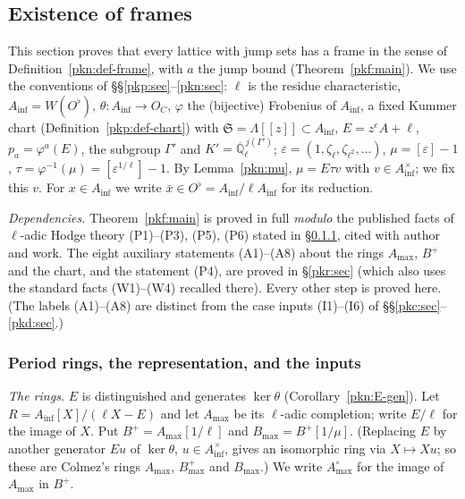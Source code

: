 \documentclass[10pt]{amsart}
\theoremstyle{definition}
\theoremstyle{remark}
\newcommand{\Q}{\mathbb Q}
\begin{document}
\providecommand{\auO}{\mathcal O}
\providecommand{\auQlb}{\overline{\Q}_\ell}
\providecommand{\pkpA}{A_{\mathrm{inf}}}
\providecommand{\pkpW}{W(C^\flat)}
\providecommand{\pkpAmb}{\mathbb A}
\providecommand{\pknBp}{B^+_{\mathrm{dR}}}
\providecommand{\pknB}{B_{\mathrm{dR}}}
\providecommand{\pkfAm}{A_{\max}}
\providecommand{\pkfAo}{A_{\max}^{\circ}}
\providecommand{\pkfBp}{B^+}
\providecommand{\pkfBm}{B_{\max}}
\providecommand{\pkfSB}{\mathfrak S_B}
\providecommand{\pkfEnd}{\mathcal G}

\subsection{Existence of frames}\label{pkf:sec}

This section proves that every lattice with jump sets has a frame in the sense of
Definition~\ref{pkn:def-frame}, with $a$ the jump bound (Theorem~\ref{pkf:main}). We use the
conventions of \S\S\ref{pkp:sec}--\ref{pkn:sec}: $\ell$ is the residue characteristic,
$\pkpA=W(O^\flat)$, $\theta\colon\pkpA\to O_C$, $\varphi$ the (bijective) Frobenius of $\pkpA$, a fixed
Kummer chart (Definition~\ref{pkp:def-chart}) with $\mathfrak S=\Lambda[[z]]\subset\pkpA$,
$E=z^eA+\ell$, $p_a=\varphi^a(E)$, the subgroup $\Gamma'$ and $K'=\auQlb^{\,j(\Gamma')}$;
$\varepsilon=(1,\zeta_\ell,\zeta_{\ell^2},\dots)$, $\mu=[\varepsilon]-1$, $\tau=\varphi^{-1}(\mu)=
[\varepsilon^{1/\ell}]-1$. By Lemma~\ref{pkn:mu}, $\mu=E\tau v$ with $v\in\pkpA^\times$; we fix this
$v$. For $x\in\pkpA$ we write $\bar x\in O^\flat=\pkpA/\ell\pkpA$ for its reduction.

\emph{Dependencies.} Theorem~\ref{pkf:main} is proved in full \emph{modulo} the published facts of
$\ell$-adic Hodge theory (P1)--(P3), (P5), (P6) stated in \S\ref{pkf:ss-rings}, cited with author and
work. The eight auxiliary statements (A1)--(A8) about the rings $\pkfAm$, $\pkfBp$ and the chart, and
the statement (P4), are proved in \S\ref{pkr:sec} (which also uses the standard facts (W1)--(W4)
recalled there). Every other step is proved here. (The labels (A1)--(A8) are distinct from the case
inputs (I1)--(I6) of \S\S\ref{pkc:sec}--\ref{pkd:sec}.)

\subsubsection{Period rings, the representation, and the inputs}\label{pkf:ss-rings}

\emph{The rings.} $E$ is distinguished and generates $\ker\theta$
(Corollary~\ref{pkn:E-gen}). Let $R=\pkpA[X]/(\ell X-E)$ and let $\pkfAm$ be its $\ell$-adic
completion; write $E/\ell$ for the image of $X$. Put $\pkfBp=\pkfAm[1/\ell]$ and
$\pkfBm=\pkfBp[1/\mu]$. (Replacing $E$ by another generator $Eu$ of $\ker\theta$, $u\in\pkpA^\times$,
gives an isomorphic ring via $X\mapsto Xu$; so these are Colmez's rings $A_{\max}$, $B^+_{\max}$ and
$B_{\max}$.) We write $\pkfAo$ for the image of $\pkfAm$ in $\pkfBp$.
\end{document}
